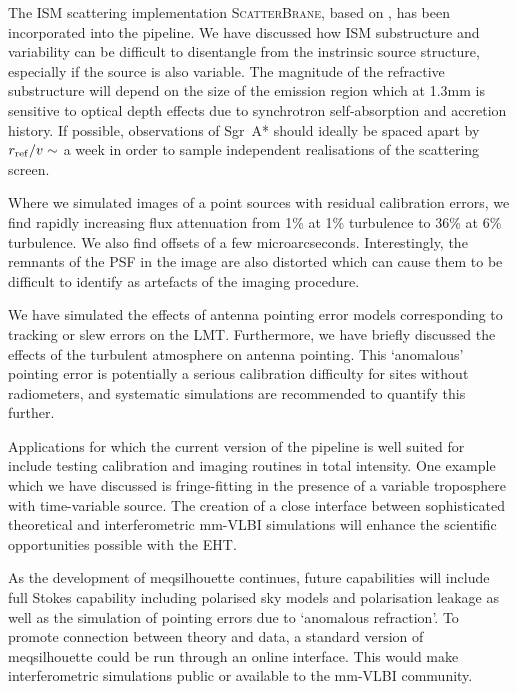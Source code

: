 The ISM scattering implementation \textsc{ScatterBrane}, based on \citet*{Johnson_2015a}, has been incorporated into the pipeline. We have discussed how ISM substructure and variability can be difficult to disentangle from the instrinsic source structure, especially if the source is also variable. The magnitude of the refractive substructure will depend on the size of the emission region which at 1.3mm is sensitive to optical depth effects due to synchrotron self-absorption and accretion history. If possible, observations of Sgr~A* should ideally be spaced apart by $r_{\rm ref}/v \sim$ a week  in order to sample independent realisations of the scattering screen. 


Where we simulated images of a point sources with residual calibration errors, we find rapidly increasing flux attenuation from 1\% at 1\% turbulence to 36\% at 6\% turbulence. We also find offsets of a few microarcseconds. Interestingly, the remnants of the PSF in the image are also distorted which can cause them to be difficult to identify as artefacts of the imaging procedure.


We have simulated the effects of antenna pointing error models corresponding to tracking or slew errors on the LMT. Furthermore, we have briefly discussed the effects of the turbulent atmosphere on antenna pointing. This `anomalous' pointing error is potentially a serious calibration difficulty for sites without radiometers, and systematic simulations are recommended to quantify this further. 

%
Applications for which the current version of the pipeline is well suited for include testing calibration and imaging routines in total intensity. One example which we have discussed is fringe-fitting in the presence of a variable troposphere with time-variable source.  
The creation of a close interface between sophisticated theoretical and interferometric mm-VLBI simulations will enhance the scientific opportunities possible with the EHT. 

As the development of {\sc meqsilhouette} continues, future capabilities will include full Stokes capability including polarised sky models and polarisation leakage as well as the simulation of pointing errors due to `anomalous refraction'.  To promote connection between theory and data, a standard version of {\sc meqsilhouette} could be run through an online interface. This would make interferometric simulations public or available to the mm-VLBI community.  














